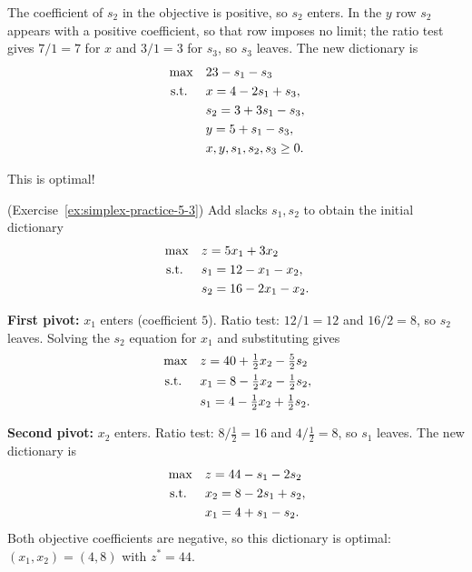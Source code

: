 \begin{solution}
The coefficient of \(s_2\) in the objective is positive, so \(s_2\) enters. In the \(y\) row \(s_2\) appears with a positive coefficient, so that row imposes no limit; the ratio test gives \(7/1 = 7\) for \(x\) and \(3/1 = 3\) for \(s_3\), so \(s_3\) leaves. The new dictionary is
\[
\begin{aligned}
\max\quad & 23 - s_1 - s_3 \\
\mbox{ s.t. }\quad & x = 4 - 2s_1 + s_3, \\
                        & s_2 = 3 + 3s_1 - s_3, \\
                        & y = 5 + s_1 - s_3, \\
                        & x, y, s_1, s_2, s_3 \ge 0.
\end{aligned}
\]

This is optimal!

\end{solution}

\begin{solution}(Exercise~\ref{ex:simplex-practice-5-3})
Add slacks $s_1, s_2$ to obtain the initial dictionary
\[
\begin{aligned}
\max\quad & z = 5x_1 + 3x_2 \\
\mbox{ s.t. }\quad & s_1 = 12 - x_1 - x_2, \\
         & s_2 = 16 - 2x_1 - x_2.
\end{aligned}
\]

\textbf{First pivot:} $x_1$ enters (coefficient $5$).  Ratio test: $12/1 = 12$ and $16/2 = 8$, so $s_2$ leaves.  Solving the $s_2$ equation for $x_1$ and substituting gives
\[
\begin{aligned}
\max\quad & z = 40 + \tfrac12 x_2 - \tfrac52 s_2 \\
\mbox{ s.t. }\quad & x_1 = 8 - \tfrac12 x_2 - \tfrac12 s_2, \\
         & s_1 = 4 - \tfrac12 x_2 + \tfrac12 s_2.
\end{aligned}
\]

\textbf{Second pivot:} $x_2$ enters.  Ratio test: $8/\tfrac12 = 16$ and $4/\tfrac12 = 8$, so $s_1$ leaves.  The new dictionary is
\[
\begin{aligned}
\max\quad & z = 44 - s_1 - 2s_2 \\
\mbox{ s.t. }\quad & x_2 = 8 - 2s_1 + s_2, \\
         & x_1 = 4 + s_1 - s_2.
\end{aligned}
\]
Both objective coefficients are negative, so this dictionary is optimal: $(x_1, x_2) = (4, 8)$ with $z^* = 44$.
\end{solution}
\vspace{1cm}

